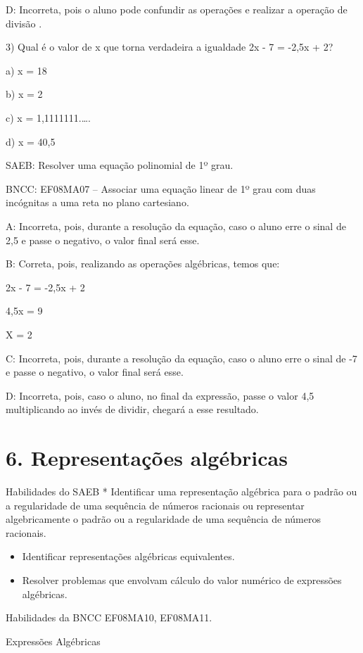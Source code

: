 D: Incorreta, pois o aluno pode confundir as operações e realizar a
operação de divisão .

3) Qual é o valor de x que torna verdadeira a igualdade 2x - 7 = -2,5x +
2?

a) x = 18

b) x = 2

c) x = 1,1111111.\ldots.

d) x = 40,5

SAEB: Resolver uma equação polinomial de 1º grau.

BNCC: EF08MA07 -- Associar uma equação linear de 1º grau com duas
incógnitas a uma reta no plano cartesiano.

A: Incorreta, pois, durante a resolução da equação, caso o aluno erre o
sinal de 2,5 e passe o negativo, o valor final será esse.

B: Correta, pois, realizando as operações algébricas, temos que:

2x - 7 = -2,5x + 2

4,5x = 9

X = 2

C: Incorreta, pois, durante a resolução da equação, caso o aluno erre o
sinal de -7 e passe o negativo, o valor final será esse.

D: Incorreta, pois, caso o aluno, no final da expressão, passe o valor
4,5 multiplicando ao invés de dividir, chegará a esse resultado.

\hypertarget{representauxe7uxf5es-alguxe9bricas}{%
\section{6. Representações
algébricas}\label{representauxe7uxf5es-alguxe9bricas}}

Habilidades do SAEB * Identificar uma representação algébrica para o
padrão ou a regularidade de uma sequência de números racionais ou
representar algebricamente o padrão ou a regularidade de uma sequência
de números racionais.

\begin{itemize}
\item
  Identificar representações algébricas equivalentes.
\item
  Resolver problemas que envolvam cálculo do valor numérico de
  expressões algébricas.
\end{itemize}

Habilidades da BNCC EF08MA10, EF08MA11.

Expressões Algébricas

